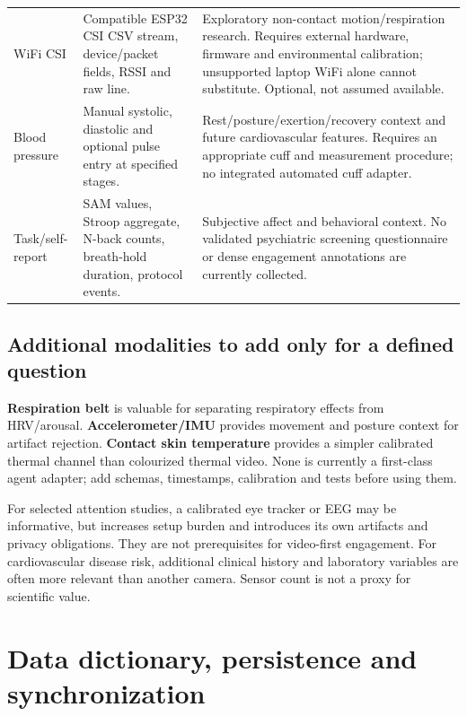 \documentclass[11pt,a4paper]{article}
\begin{document}
\begin{longtable}{@{}L{.18\textwidth}L{.34\textwidth}L{.41\textwidth}@{}}
WiFi CSI & Compatible ESP32 CSI CSV stream, device/packet fields, RSSI and raw line. & Exploratory non-contact motion/respiration research. Requires external hardware, firmware and environmental calibration; unsupported laptop WiFi alone cannot substitute. Optional, not assumed available.\\
Blood pressure & Manual systolic, diastolic and optional pulse entry at specified stages. & Rest/posture/exertion/recovery context and future cardiovascular features. Requires an appropriate cuff and measurement procedure; no integrated automated cuff adapter.\\
Task/self-report & SAM values, Stroop aggregate, N-back counts, breath-hold duration, protocol events. & Subjective affect and behavioral context. No validated psychiatric screening questionnaire or dense engagement annotations are currently collected.\\
\bottomrule
\end{longtable}
\normalsize

\subsection{Additional modalities to add only for a defined question}
\textbf{Respiration belt} is valuable for separating respiratory effects from HRV/arousal. \textbf{Accelerometer/IMU} provides movement and posture context for artifact rejection. \textbf{Contact skin temperature} provides a simpler calibrated thermal channel than colourized thermal video. None is currently a first-class agent adapter; add schemas, timestamps, calibration and tests before using them.

For selected attention studies, a calibrated eye tracker or EEG may be informative, but increases setup burden and introduces its own artifacts and privacy obligations. They are not prerequisites for video-first engagement. For cardiovascular disease risk, additional clinical history and laboratory variables are often more relevant than another camera. Sensor count is not a proxy for scientific value.

\section{Data dictionary, persistence and synchronization}
\end{document}
